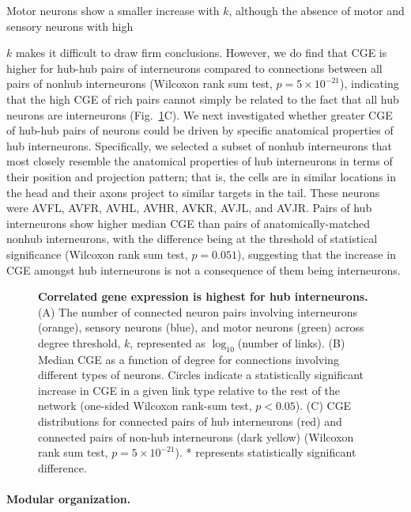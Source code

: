 \documentclass[10pt,letterpaper]{article}
\begin{document}
Motor neurons show a smaller increase with $k$, although the absence of motor and sensory neurons with high {$k$ makes it difficult to draw firm conclusions.
However, we do find that CGE is higher for hub-hub pairs of interneurons compared to connections between all pairs of nonhub interneurons (Wilcoxon rank sum test, $p = 5 \times 10^{-21}$), indicating that the high CGE of rich pairs cannot simply be related to the fact that all hub neurons are interneurons (Fig.~\ref{fig:Fig7}C).
We next investigated whether greater CGE of hub-hub pairs of neurons could be driven by specific anatomical properties of hub interneurons.
Specifically, we selected a subset of nonhub interneurons that most closely resemble the anatomical properties of hub interneurons in terms of their position and projection pattern; that is, the cells are in similar locations in the head and their axons project to similar targets in the tail. These neurons were AVFL, AVFR, AVHL, AVHR, AVKR, AVJL, and AVJR.
Pairs of hub interneurons show higher median CGE than pairs of anatomically-matched nonhub interneurons, with the difference being at the threshold of statistical significance (Wilcoxon rank sum test, $p = 0.051$), suggesting that the increase in CGE amongst hub interneurons is not a consequence of them being interneurons.

\begin{figure}[h]
\centering
 \caption{
\textbf{Correlated gene expression is highest for hub interneurons.}
(A) The number of connected neuron pairs involving interneurons (orange), sensory neurons (blue), and motor neurons (green) across degree threshold, $k$, represented as $\log_{10}$(number of links).
(B) Median CGE as a function of degree for connections involving different types of neurons.
Circles indicate a statistically significant increase in CGE in a given link type relative to the rest of the network (one-sided Wilcoxon rank-sum test, $p < 0.05$).
(C) CGE distributions for connected pairs of hub interneurons (red) and connected pairs of non-hub interneurons (dark yellow) (Wilcoxon rank sum test, $p = 5 \times 10^{-21}$). * represents statistically significant difference.
}
 \label{fig:Fig7}
\end{figure}

\paragraph{Modular organization.}

}
\end{document}
